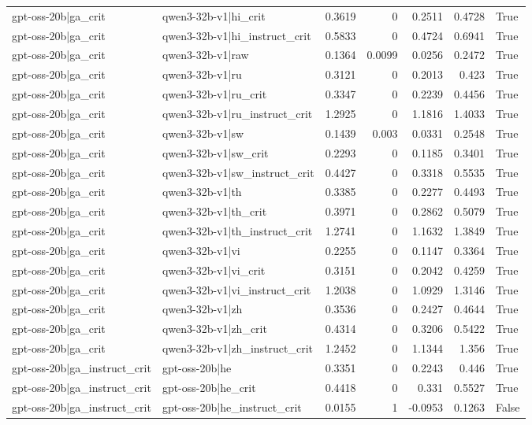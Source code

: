 \begin{table}
\begin{tabular}{l l r r r r l}
gpt-oss-20b|ga_crit & qwen3-32b-v1|hi_crit & 0.3619 & 0 & 0.2511 & 0.4728 & True \\
gpt-oss-20b|ga_crit & qwen3-32b-v1|hi_instruct_crit & 0.5833 & 0 & 0.4724 & 0.6941 & True \\
gpt-oss-20b|ga_crit & qwen3-32b-v1|raw & 0.1364 & 0.0099 & 0.0256 & 0.2472 & True \\
gpt-oss-20b|ga_crit & qwen3-32b-v1|ru & 0.3121 & 0 & 0.2013 & 0.423 & True \\
gpt-oss-20b|ga_crit & qwen3-32b-v1|ru_crit & 0.3347 & 0 & 0.2239 & 0.4456 & True \\
gpt-oss-20b|ga_crit & qwen3-32b-v1|ru_instruct_crit & 1.2925 & 0 & 1.1816 & 1.4033 & True \\
gpt-oss-20b|ga_crit & qwen3-32b-v1|sw & 0.1439 & 0.003 & 0.0331 & 0.2548 & True \\
gpt-oss-20b|ga_crit & qwen3-32b-v1|sw_crit & 0.2293 & 0 & 0.1185 & 0.3401 & True \\
gpt-oss-20b|ga_crit & qwen3-32b-v1|sw_instruct_crit & 0.4427 & 0 & 0.3318 & 0.5535 & True \\
gpt-oss-20b|ga_crit & qwen3-32b-v1|th & 0.3385 & 0 & 0.2277 & 0.4493 & True \\
gpt-oss-20b|ga_crit & qwen3-32b-v1|th_crit & 0.3971 & 0 & 0.2862 & 0.5079 & True \\
gpt-oss-20b|ga_crit & qwen3-32b-v1|th_instruct_crit & 1.2741 & 0 & 1.1632 & 1.3849 & True \\
gpt-oss-20b|ga_crit & qwen3-32b-v1|vi & 0.2255 & 0 & 0.1147 & 0.3364 & True \\
gpt-oss-20b|ga_crit & qwen3-32b-v1|vi_crit & 0.3151 & 0 & 0.2042 & 0.4259 & True \\
gpt-oss-20b|ga_crit & qwen3-32b-v1|vi_instruct_crit & 1.2038 & 0 & 1.0929 & 1.3146 & True \\
gpt-oss-20b|ga_crit & qwen3-32b-v1|zh & 0.3536 & 0 & 0.2427 & 0.4644 & True \\
gpt-oss-20b|ga_crit & qwen3-32b-v1|zh_crit & 0.4314 & 0 & 0.3206 & 0.5422 & True \\
gpt-oss-20b|ga_crit & qwen3-32b-v1|zh_instruct_crit & 1.2452 & 0 & 1.1344 & 1.356 & True \\
gpt-oss-20b|ga_instruct_crit & gpt-oss-20b|he & 0.3351 & 0 & 0.2243 & 0.446 & True \\
gpt-oss-20b|ga_instruct_crit & gpt-oss-20b|he_crit & 0.4418 & 0 & 0.331 & 0.5527 & True \\
gpt-oss-20b|ga_instruct_crit & gpt-oss-20b|he_instruct_crit & 0.0155 & 1 & -0.0953 & 0.1263 & False \\

\end{tabular}
\end{table}

